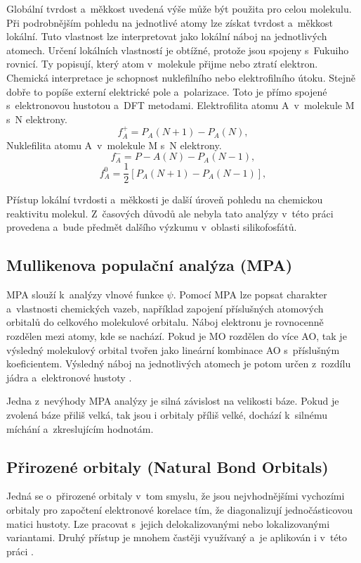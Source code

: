 \documentclass[
digital, %
table,   %
nolof,     %
nolot,     %
oneside,
]{fithesis3}
\begin{document}
Globální tvrdost a~měkkost uvedená výše může být použita pro celou molekulu. Při podrobnějším pohledu na jednotlivé atomy lze získat tvrdost a~měkkost lokální. Tuto vlastnost lze interpretovat jako lokální náboj na jednotlivých atomech. Určení lokálních vlastností je obtížné, protože jsou spojeny s~Fukuiho rovnicí. Ty popisují, který atom v~molekule přijme nebo ztratí elektron. Chemická interpretace je schopnost nuklefilního nebo elektrofilního útoku. Stejně dobře to popíše externí elektrické pole a~polarizace. Toto je přímo spojené s~elektronovou hustotou a~DFT metodami. Elektrofilita atomu A~v~molekule M s~N elektrony.
\begin{equation}
f_A^+ = P_A(N+1) - P_A(N),
\end{equation}
Nuklefilita atomu A~v~molekule M s~N elektrony.
\begin{equation}
f_A^- = P-A(N) - P_A(N-1),
\end{equation}
\begin{equation}
f_A^0 = \frac{1}{2}[P_A(N+1) - P_A(N-1)],
\end{equation}

Přístup lokální tvrdosti a~měkkosti je další úroveň pohledu na chemickou reaktivitu molekul. Z~časových důvodů ale nebyla tato analýzy v~této práci provedena a~bude předmět dalšího výzkumu v~oblasti silikofosfátů.

\subsection{Mullikenova populační analýza (MPA)}
MPA slouží k~analýzy vlnové funkce $\psi$. Pomocí MPA lze popsat charakter a~vlastnosti chemických vazeb, například zapojení příslušných atomových orbitalů do celkového molekulové orbitalu. Náboj elektronu je rovnocenně rozdělen mezi atomy, kde se nachází. Pokud je MO rozdělen do více AO, tak je výsledný molekulový orbital tvořen jako lineární kombinace AO s~příslušným koeficientem. Výsledný náboj na jednotlivých atomech je potom určen z~rozdílu jádra a~elektronové hustoty \cite{lowe2011quantum}.

Jedna z~nevýhody MPA analýzy je silná závislost na velikosti báze. Pokud je zvolená báze přiliš velká, tak jsou i orbitaly příliš velké, dochází k~silnému míchání a~zkreslujícím hodnotám.

\subsection{Přirozené orbitaly (Natural Bond Orbitals)}
Jedná se o~přirozené orbitaly v~tom smyslu, že jsou nejvhodnějšími vychozími orbitaly pro započtení elektronové korelace tím, že diagonalizují jednočásticovou matici hustoty. Lze pracovat s~jejich delokalizovanými nebo lokalizovanými variantami. Druhý přístup je mnohem častěji využívaný a~je aplikován i v~této práci \cite{weinhold2005valency}.
\end{document}

